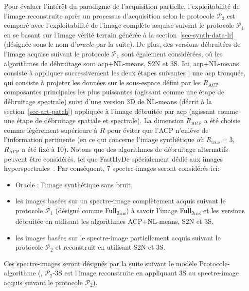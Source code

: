 Pour évaluer l'intérêt du paradigme de l'acquisition partielle, l'exploitabilité de l'image reconstruite après un processus d'acquisition selon le protocole $\mathcal{P}_2$ est comparé avec l'exploitabilité de l'image complète acquise suivant le protocole $\mathcal{P}_1$ en se basant sur l'image vérité terrain générée à la section~\ref{sec-synth-data-lr} (désignée sous le nom d'\emph{oracle} par la suite). De plus, des versions débruitées de l'image acquise suivant le protocole $\mathcal{P}_1$ sont également considérées, où les algorithmes de débruitage sont \gls{acp}+NL-means, S2N et 3S. Ici, \gls{acp}+NL-means consiste à appliquer successivement les deux étapes suivantes : une \gls{acp} tronquée, qui consiste à projeter les données sur le sous-espace défini par les $R_{\mathrm{ACP}}$ composantes principales les plus puissantes (agissant comme une étape de débruitage spectrale) suivi d'une version 3D de NL-means (décrit à la section~\ref{sec-art-patch}) appliquée à l'image débruitée par \gls{acp} (agissant comme une étape de débruitage spatiale et spectrale).
%
La dimension $R_{\mathrm{ACP}}$ a été choisie comme légèrement supérieure à $R$ pour éviter que l'ACP n'enlève de l'information pertinente (en ce qui concerne l'image synthétique où $R_{\mathrm{true}}=3$, $R_{\mathrm{ACP}}$ a été fixé à 10). Notons que des algorithmes de débruitage alternatifs peuvent être considérés, tel que FastHyDe spécialement dédié aux images hyperspectrales~\cite{bioucaspaper}. Par conséquent, 7 spectre-images seront considérés ici:
\begin{itemize}
    \item Oracle : l'image synthétique sans bruit,
    \item les images basées sur un spectre-image complètement acquis suivant le protocole $\mathcal{P}_1$ (désigné comme Full\textsubscript{2ms}) à savoir l'image Full\textsubscript{2ms} et les versions débruitée en utilisant les algorithmes ACP+NL-means, S2N et 3S.
    \item les images basées sur le spectre-image partiellement acquis suivant le protocole $\mathcal{P}_2$ et reconstruit en utilisant S2N et 3S.
\end{itemize}
Ces spectre-images seront désignés par la suite suivant le modèle Protocole-algorithme (\eg{}, $\mathcal{P}_2$-3S est l'image reconstruite en appliquant 3S au spectre-image acquis suivant le protocole $\mathcal{P}_2$).

